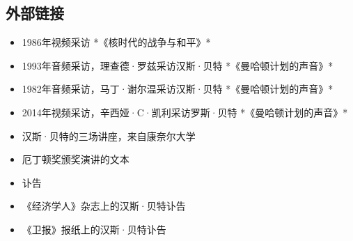 \subsection{外部链接}
\begin{itemize}
\item 1986年视频采访 *《核时代的战争与和平》*  
\item 1993年音频采访，理查德·罗兹采访汉斯·贝特 *《曼哈顿计划的声音》*  
\item 1982年音频采访，马丁·谢尔温采访汉斯·贝特 *《曼哈顿计划的声音》*  
\item 2014年视频采访，辛西娅·C·凯利采访罗斯·贝特 *《曼哈顿计划的声音》*  
\item 汉斯·贝特的三场讲座，来自康奈尔大学  
\item 厄丁顿奖颁奖演讲的文本  
\item 讣告  
\item 《经济学人》杂志上的汉斯·贝特讣告  
\item 《卫报》报纸上的汉斯·贝特讣告
\end{itemize}